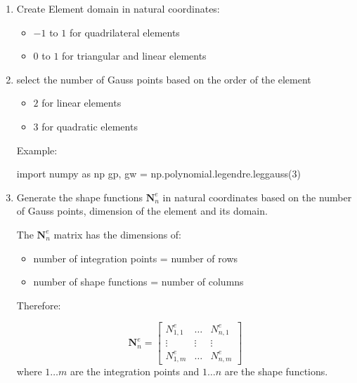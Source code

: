 \documentclass[10pt,b5paper,titlepage]{book}
\newcommand{\m}{\mathbf}
\begin{document}
\begin{enumerate}
    \item Create Element domain in natural coordinates:
        \begin{itemize}
            \item $ -1 $ to $ 1 $ for quadrilateral elements
            \item $ 0 $ to $ 1 $ for triangular and linear elements
        \end{itemize}

    \item select the number of Gauss points based on the order of the element
        \begin{itemize}
            \item $ 2 $ for linear elements
            \item $ 3 $ for quadratic elements
        \end{itemize}

        Example:
        \begin{python}
import numpy as np
gp, gw = np.polynomial.legendre.leggauss(3)
        \end{python}

    \item Generate the shape functions $ \m{N}_n^e $ in natural coordinates
        based on the number of Gauss points, dimension of the element and its domain.

        The $ \m{N}_n^e $ matrix has the dimensions of:
        \begin{itemize}
            \item number of integration points = number of rows
            \item number of shape functions = number of columns
        \end{itemize}

        Therefore:

        \begin{equation}
            \m{N}_n^e = \begin{bmatrix}
                N_{1,1}^e & \dots & N_{n,1}^e\\
                \vdots & \vdots & \vdots\\
                N_{1,m}^e & \dots & N_{n,m}^e
            \end{bmatrix}
        \end{equation}
         where $ 1 \dots m $ are the integration points and $ 1 \dots n $ are the shape
         functions.


\end{enumerate}
\end{document}
